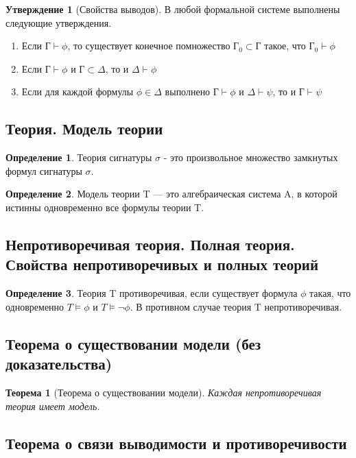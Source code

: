 \documentclass[a4paper]{article}
\newtheorem{theorem}{Теорема}[section]
\theoremstyle{definition}
\newtheorem*{definition}{Определение}
\newtheorem*{statement}{Утверждение}
\theoremstyle{remark}
\begin{document}
	\begin{statement}[Свойства выводов]
		В любой формальной системе выполнены следующие утверждения.
		\begin{enumerate}
			\item Если $Г \vdash \phi$, то существует конечное помножество $Г_0 \subset Г$ такое, что $Г_0 \vdash \phi$
			\item Если $Г \vdash \phi$ и $Г \subset \Delta$, то и $\Delta \vdash \phi$
			\item Если для каждой формулы $\phi \in \Delta$ выполнено $Г \vdash \phi$ и $\Delta \vdash \psi$, то и $Г \vdash \psi$
		\end{enumerate}
	\end{statement}
    \subsection{Теория. Модель теории}
    \begin{definition}
        Теория сигнатуры $\sigma$ - это произвольное множество замкнутых формул сигнатуры  $\sigma$.
    \end{definition}
    \begin{definition}
        Модель теории T — это алгебраическая система A, в которой истинны одновременно все 
    формулы теории T.
    \end{definition}
    \subsection{Непротиворечивая теория. Полная теория. Свойства непротиворечивых и полных теорий}
    \begin{definition}
        Теория T противоречивая, если существует формула $\phi$ такая, что одновременно 
    $T \models \phi$ и $T \models \neg\phi$. В противном случае теория T непротиворечивая.
    \end{definition}
    \subsection{Теорема о существовании модели (без доказательства)}
    \begin{theorem}[Теорема о существовании модели]
        Каждая непротиворечивая теория имеет модель. 
    \end{theorem}
    \subsection{Теорема о связи выводимости и противоречивости}
\end{document}
